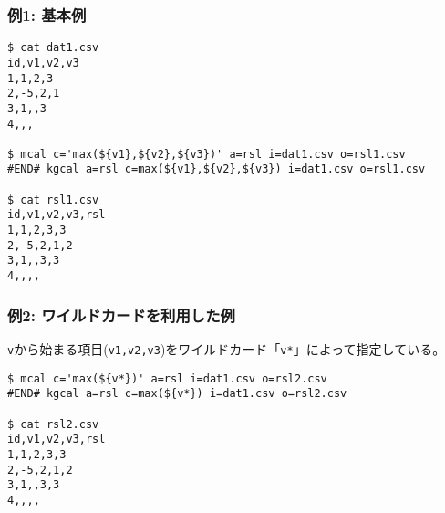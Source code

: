 
\subsubsection*{例1: 基本例}


\begin{Verbatim}[baselinestretch=0.7,frame=single]
$ cat dat1.csv
id,v1,v2,v3
1,1,2,3
2,-5,2,1
3,1,,3
4,,,

$ mcal c='max(${v1},${v2},${v3})' a=rsl i=dat1.csv o=rsl1.csv
#END# kgcal a=rsl c=max(${v1},${v2},${v3}) i=dat1.csv o=rsl1.csv

$ cat rsl1.csv
id,v1,v2,v3,rsl
1,1,2,3,3
2,-5,2,1,2
3,1,,3,3
4,,,,
\end{Verbatim}

\subsubsection*{例2: ワイルドカードを利用した例}

\verb|v|から始まる項目(\verb|v1,v2,v3|)をワイルドカード「\verb|v*|」によって指定している。

\begin{Verbatim}[baselinestretch=0.7,frame=single]
$ mcal c='max(${v*})' a=rsl i=dat1.csv o=rsl2.csv
#END# kgcal a=rsl c=max(${v*}) i=dat1.csv o=rsl2.csv

$ cat rsl2.csv
id,v1,v2,v3,rsl
1,1,2,3,3
2,-5,2,1,2
3,1,,3,3
4,,,,
\end{Verbatim}
